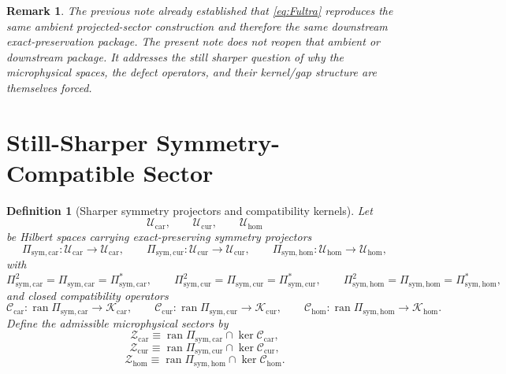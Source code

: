 \documentclass[11pt]{article}
\newcommand{\UltraTensorClass}{\mathscr Z_{\mathrm{car}}}
\newcommand{\UltraRelabelClass}{\mathscr Z_{\mathrm{cur}}}
\newcommand{\UltraFreeClass}{\mathscr Z_{\mathrm{hom}}}
\newcommand{\RootTensorClass}{\mathscr U_{\mathrm{car}}}
\newcommand{\RootRelabelClass}{\mathscr U_{\mathrm{cur}}}
\newcommand{\RootFreeClass}{\mathscr U_{\mathrm{hom}}}
\newcommand{\TensorSymProj}{\Pi_{\mathrm{sym,car}}}
\newcommand{\CurSymProj}{\Pi_{\mathrm{sym,cur}}}
\newcommand{\HomSymProj}{\Pi_{\mathrm{sym,hom}}}
\newcommand{\TensorCompat}{\mathcal C_{\mathrm{car}}}
\newcommand{\CurCompat}{\mathcal C_{\mathrm{cur}}}
\newcommand{\HomCompat}{\mathcal C_{\mathrm{hom}}}
\newtheorem{definition}{Definition}
\newtheorem{remark}{Remark}
\begin{document}
\begin{remark}
The previous note already established that \eqref{eq:Fultra} reproduces the same ambient projected-sector construction and therefore the same downstream exact-preservation package. The present note does not reopen that ambient or downstream package. It addresses the still sharper question of why the microphysical spaces, the defect operators, and their kernel/gap structure are themselves forced.
\end{remark}

\section{Still-Sharper Symmetry-Compatible Sector}

\begin{definition}[Sharper symmetry projectors and compatibility kernels]
\label{def:root}
Let
\[
\RootTensorClass,\qquad
\RootRelabelClass,\qquad
\RootFreeClass
\]
be Hilbert spaces carrying exact-preserving symmetry projectors
\begin{equation}
\TensorSymProj:\RootTensorClass\to\RootTensorClass,
\qquad
\CurSymProj:\RootRelabelClass\to\RootRelabelClass,
\qquad
\HomSymProj:\RootFreeClass\to\RootFreeClass,
\label{eq:sym_proj}
\end{equation}
with
\[
\TensorSymProj^2=\TensorSymProj=\TensorSymProj^*,
\qquad
\CurSymProj^2=\CurSymProj=\CurSymProj^*,
\qquad
\HomSymProj^2=\HomSymProj=\HomSymProj^*,
\]
and closed compatibility operators
\begin{equation}
\TensorCompat:\operatorname{ran}\TensorSymProj\to\mathscr K_{\mathrm{car}},
\qquad
\CurCompat:\operatorname{ran}\CurSymProj\to\mathscr K_{\mathrm{cur}},
\qquad
\HomCompat:\operatorname{ran}\HomSymProj\to\mathscr K_{\mathrm{hom}}.
\label{eq:compat}
\end{equation}
Define the admissible microphysical sectors by
\begin{equation}
\UltraTensorClass
\equiv
\operatorname{ran}\TensorSymProj\cap\ker\TensorCompat,
\label{eq:ultra_tensor_sector}
\end{equation}
\begin{equation}
\UltraRelabelClass
\equiv
\operatorname{ran}\CurSymProj\cap\ker\CurCompat,
\label{eq:ultra_relabel_sector}
\end{equation}
\begin{equation}
\UltraFreeClass
\equiv
\operatorname{ran}\HomSymProj\cap\ker\HomCompat.
\label{eq:ultra_free_sector}
\end{equation}

\end{definition}
\end{document}
